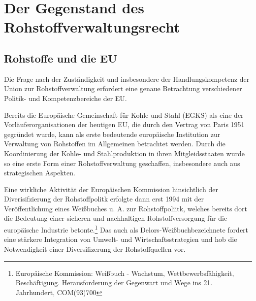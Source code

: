 \documentclass[12pt,a4paper,oneside]{book} %
\begin{document}
	
	\chapter{Der Gegenstand des Rohstoffverwaltungsrecht}
	
	\section{Rohstoffe und die EU}
	
	
	Die Frage nach der Zuständigkeit und insbesondere der Handlungskompetenz der Union zur Rohstoffverwaltung erfordert eine genaue Betrachtung verschiedener Politik- und Kompetenzbereiche der EU.
	
	Bereits die Europäische Gemeinschaft für Kohle und Stahl (EGKS) als eine der Vorläuferorganisationen der heutigen EU, die durch den Vertrag von Paris 1951 gegründet wurde, kann als erste bedeutende europäische Institution zur Verwaltung von Rohstoffen im Allgemeinen betrachtet werden. Durch die Koordinierung der Kohle- und Stahlproduktion in ihren Mitgleidsstaaten wurde so eine erste Form einer Rohstoffverwaltung geschaffen, insbesondere auch aus strategischen Aspekten.\autocite{QUOTE NEEDED}
	
	Eine wirkliche Aktivität der Europäischen Kommission hinsichtlich der Diverisifzierung der Rohstoffpolitk erfolgte dann erst 1994 mit der Veröffentlichung eines Weißbuches u. A. zur Rohstoffpoliitk, welches bereits dort die Bedeutung einer sicheren und nachhaltigen Rohstoffversorgung für die europäische Industrie betonte.\footnote{Europäische Kommission: Weißbuch - Wachstum, Wettbewerbsfähigkeit, Beschäftigung. Herausforderung der Gegenwart und Wege ins 21. Jahrhundert, COM(93)700}
	Das auch als \glqq Delors-Weißbuch\grqq bezeichnete  fordert eine stärkere Integration von Umwelt- und Wirtschaftsstrategien und hob die Notwendigkeit einer Diversifizerung der Rohstoffquellen vor.
	
\end{document}
